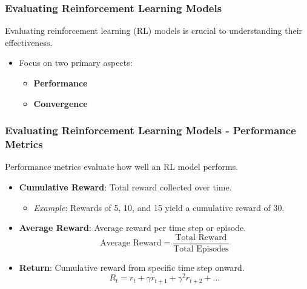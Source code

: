 \documentclass[aspectratio=169]{beamer}
\begin{document}
\begin{frame}[fragile]
    \frametitle{Evaluating Reinforcement Learning Models}
    Evaluating reinforcement learning (RL) models is crucial to understanding their effectiveness.
    \begin{itemize}
        \item Focus on two primary aspects: 
        \begin{itemize}
            \item \textbf{Performance}
            \item \textbf{Convergence}
        \end{itemize}
    \end{itemize}
\end{frame}

\begin{frame}[fragile]
    \frametitle{Evaluating Reinforcement Learning Models - Performance Metrics}
    Performance metrics evaluate how well an RL model performs.
    \begin{itemize}
        \item \textbf{Cumulative Reward}: Total reward collected over time.
        \begin{itemize}
            \item \textit{Example}: Rewards of 5, 10, and 15 yield a cumulative reward of \(30\).
        \end{itemize}
        \item \textbf{Average Reward}: Average reward per time step or episode.
        \begin{equation}
            \text{Average Reward} = \frac{\text{Total Reward}}{\text{Total Episodes}}
        \end{equation}
        \item \textbf{Return}: Cumulative reward from specific time step onward.
        \begin{equation}
            R_t = r_t + \gamma r_{t+1} + \gamma^2 r_{t+2} + \ldots
        \end{equation}
    \end{itemize}
\end{frame}
\end{document}
